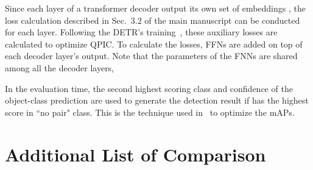 \documentclass[final]{cvpr}
\begin{document}
Since each layer of a transformer decoder output its own set of embeddings , the loss calculation described in Sec.~{3.2} of the main manuscript can be conducted for each layer. Following the DETR's training~\cite{carion_eccv2020}, these auxiliary losses are calculated to optimize QPIC. To calculate the losses, FFNs are added on top of each decoder layer's output. Note that the parameters of the FNNs are shared among all the decoder layers, 

In the evaluation time, the second highest scoring class and confidence of the object-class prediction  are used to generate the detection result if  has the highest score in ``no pair" class. This is the technique used in~\cite{carion_eccv2020} to optimize the mAPs.

\section{Additional List of Comparison}
\end{document}
